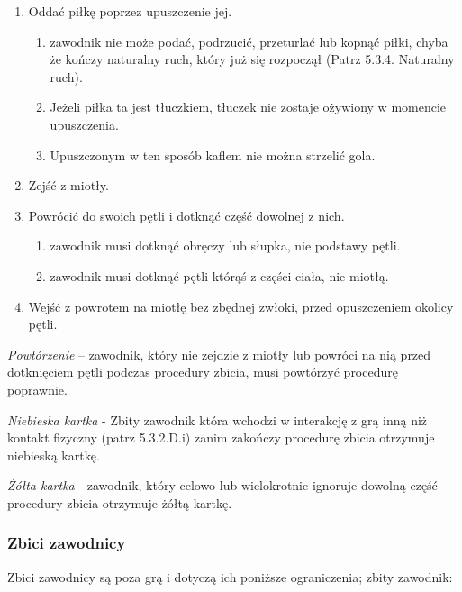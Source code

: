 \documentclass[12pt]{article}
\begin{document}
\begin{enumerate}
	\item
	      Oddać piłkę poprzez upuszczenie jej.

	      \begin{enumerate}
		      \item
		            zawodnik nie może podać, podrzucić, przeturlać lub kopnąć piłki,
		            chyba że kończy naturalny ruch, który już się rozpoczął (Patrz
		            5.3.4. Naturalny ruch).
		      \item
		            Jeżeli piłka ta jest tłuczkiem, tłuczek nie zostaje ożywiony w
		            momencie upuszczenia.
		      \item
		            Upuszczonym w ten sposób kaflem nie można strzelić gola.
	      \end{enumerate}
	\item
	      Zejść z miotły.
	\item
	      Powrócić do swoich pętli i dotknąć część dowolnej z nich.

	      \begin{enumerate}
		      \item
		            zawodnik musi dotknąć obręczy lub słupka, nie podstawy pętli.
		      \item
		            zawodnik musi dotknąć pętli którąś z części ciała, nie miotłą.
	      \end{enumerate}
	\item Wejść z powrotem na miotłę bez zbędnej zwłoki, przed opuszczeniem
	      okolicy pętli.

\end{enumerate}

\emph{Powtórzenie} -- zawodnik, który nie zejdzie z miotły lub powróci
na nią przed dotknięciem pętli podczas procedury zbicia, musi powtórzyć
procedurę poprawnie.

\emph{Niebieska kartka} - Zbity zawodnik która wchodzi w interakcję z
grą inną niż kontakt fizyczny (patrz 5.3.2.D.i) zanim zakończy procedurę
zbicia otrzymuje niebieską kartkę.

\emph{Żółta kartka} - zawodnik, który celowo lub wielokrotnie ignoruje
dowolną część procedury zbicia otrzymuje żółtą kartkę.

\subsubsection{Zbici zawodnicy}

Zbici zawodnicy są poza grą i dotyczą ich poniższe ograniczenia; zbity
zawodnik:
\end{document}
